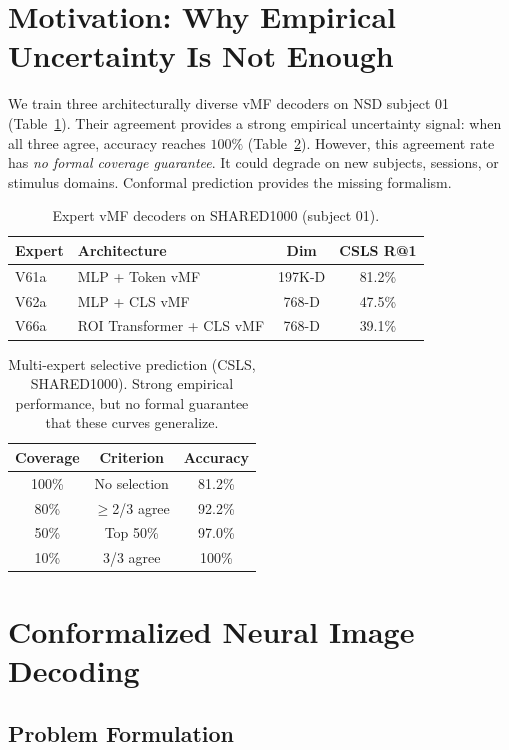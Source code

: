 \documentclass{article}
\begin{document}
\section{Motivation: Why Empirical Uncertainty Is Not Enough}
\label{sec:motivation}

We train three architecturally diverse vMF decoders on NSD subject 01 (Table~\ref{tab:experts}). Their agreement provides a strong empirical uncertainty signal: when all three agree, accuracy reaches $100\%$ (Table~\ref{tab:agreement}). However, this agreement rate has \emph{no formal coverage guarantee}. It could degrade on new subjects, sessions, or stimulus domains. Conformal prediction provides the missing formalism.

\begin{table}[t]
\centering
\caption{Expert vMF decoders on SHARED1000 (subject 01).}
\label{tab:experts}
\begin{tabular}{llcc}
\toprule
Expert & Architecture & Dim & CSLS R@1 \\
\midrule
V61a & MLP + Token vMF & 197K-D & 81.2\% \\
V62a & MLP + CLS vMF & 768-D & 47.5\% \\
V66a & ROI Transformer + CLS vMF & 768-D & 39.1\% \\
\bottomrule
\end{tabular}
\end{table}

\begin{table}[t]
\centering
\caption{Multi-expert selective prediction (CSLS, SHARED1000). Strong empirical performance, but no formal guarantee that these curves generalize.}
\label{tab:agreement}
\begin{tabular}{ccc}
\toprule
Coverage & Criterion & Accuracy \\
\midrule
100\% & No selection & 81.2\% \\
80\% & $\geq$2/3 agree & 92.2\% \\
50\% & Top 50\% & 97.0\% \\
10\% & 3/3 agree & 100\% \\
\bottomrule
\end{tabular}
\end{table}

\section{Conformalized Neural Image Decoding}
\label{sec:method}

\subsection{Problem Formulation}
\end{document}
